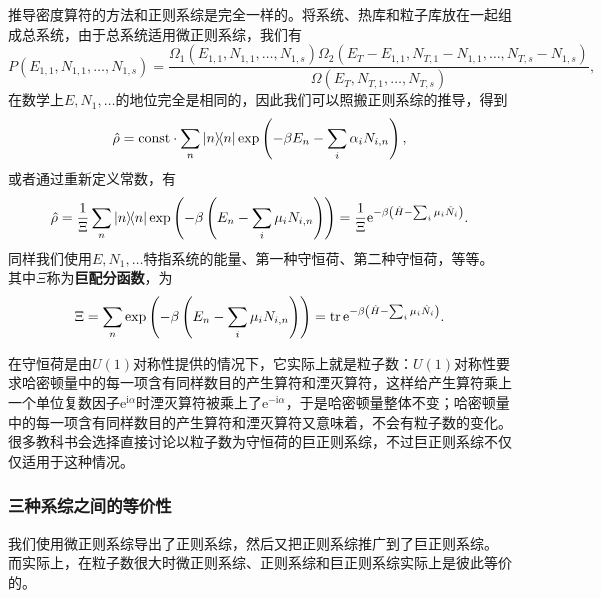 \documentclass[hyperref, UTF8, a4paper]{ctexart}
\newcommand*{\ii}{\mathrm{i}}
\newcommand*{\ee}{\mathrm{e}}
\newcommand*{\const}{\mathrm{const}}
\begin{document}
推导密度算符的方法和正则系综是完全一样的。将系统、热库和粒子库放在一起组成总系统，由于总系统适用微正则系综，我们有
\[
    P(E_{1,1}, N_{1,1}, \ldots, N_{1,s}) = \frac{\Omega_1(E_{1,1}, N_{1,1}, \ldots, N_{1,s})\Omega_2(E_T-E_{1,1}, N_{T,1}-N_{1,1}, \ldots, N_{T,s}-N_{1,s})}{\Omega(E_T, N_{T,1}, \ldots, N_{T,s})},
\]
在数学上$E,N_1,\ldots$的地位完全是相同的，因此我们可以照搬正则系综的推导，得到
\[
    \hat{\rho} = \const \cdot \sum_n \dyad{n} \exp\left(-\beta E_n - \sum_i \alpha_i N_{i,n}\right),
\]
或者通过重新定义常数，有
\begin{equation}
    \hat{\rho} = \frac{1}{\Xi} \sum_n \dyad{n} \exp \left(-\beta \left(E_n - \sum_i \mu_i N_{i,n}\right)\right) = \frac{1}{\Xi} \ee^{- \beta \left( \hat{H} - \sum_i \mu_i \hat{N}_i \right) }.
    \label{eq:grand-canonical-ensemble-density-operator}
\end{equation}
同样我们使用$E,N_1,\ldots$特指系统的能量、第一种守恒荷、第二种守恒荷，等等。
其中$\Xi$称为\textbf{巨配分函数}，为
\begin{equation}
    \Xi =  \sum_n \exp \left(-\beta \left(E_n - \sum_i \mu_i N_{i,n}\right)\right) = \trace \ee^{- \beta \left( \hat{H} - \sum_i \mu_i \hat{N}_i \right) }.
\end{equation}

在守恒荷是由$U(1)$对称性提供的情况下，它实际上就是粒子数：$U(1)$对称性要求哈密顿量中的每一项含有同样数目的产生算符和湮灭算符，这样给产生算符乘上一个单位复数因子$\ee^{\ii \alpha}$时湮灭算符被乘上了$\ee^{ - \ii \alpha}$，于是哈密顿量整体不变；哈密顿量中的每一项含有同样数目的产生算符和湮灭算符又意味着，不会有粒子数的变化。
很多教科书会选择直接讨论以粒子数为守恒荷的巨正则系综，不过巨正则系综不仅仅适用于这种情况。

\subsubsection{三种系综之间的等价性}

我们使用微正则系综导出了正则系综，然后又把正则系综推广到了巨正则系综。
而实际上，在粒子数很大时微正则系综、正则系综和巨正则系综实际上是彼此等价的。
\end{document}
